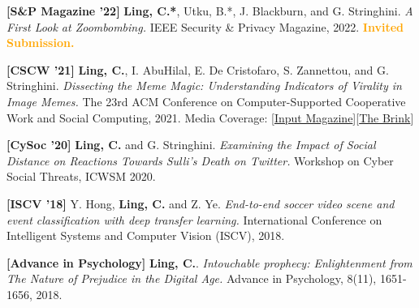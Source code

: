 \documentclass[12pt]{resume}
\begin{document}
\begin{etaremune}[leftmargin=.6in]
  \item \textbf{[S\&P Magazine '22]} 
    \textbf{Ling, C.*}, Utku, B.*, J. Blackburn, and G. Stringhini.
    \newline \textit{A First Look at Zoombombing.}
    \newline IEEE Security \& Privacy Magazine, 2022. \textbf{\textcolor{orange}{Invited Submission.}}

    
    \item \textbf{[CSCW '21]}
   \textbf{Ling, C.}, I. AbuHilal, E. De Cristofaro, S. Zannettou, and G. Stringhini.
   \newline \textit{Dissecting the Meme Magic: Understanding Indicators of Virality in Image Memes.} 
   \newline The 23rd ACM Conference on Computer-Supported Cooperative Work and Social Computing, 2021. 
   \newline Media Coverage: [\href{https://www.inverse.com/input/culture/viral-meme-ai-study-bernie-sanders}{Input Magazine}][\href{https://www.bu.edu/articles/2021/bernie-sanders-sitting-memes-instant-popularity-explained-by-science/?utm_source=twitter&utm_medium=link&utm_content=research_computerscience&utm_campaign=social_experts}{The Brink}] 
    
    \item \textbf{[CySoc '20]}
    \textbf{Ling, C.} and G. Stringhini. 
    \newline \textit{Examining the Impact of Social Distance on Reactions Towards Sulli’s Death on Twitter.}
    \newline Workshop on Cyber Social Threats, ICWSM 2020. 
    
    \item \textbf{[ISCV '18]}
    Y. Hong, \textbf{Ling, C.} and Z. Ye. 
    \newline \textit{End-to-end soccer video scene and event classification with deep transfer learning.} 
    \newline International Conference on Intelligent Systems and Computer Vision (ISCV), 2018. 
    \newline [\href{https://ieeexplore.ieee.org/stamp/stamp.jsp?tp=&arnumber=8369043}{Paper}]

    \item \textbf{[Advance in Psychology]}
    \textbf{Ling, C.}. 
    \newline \textit{Intouchable prophecy: Enlightenment from The Nature of Prejudice in the Digital Age.} 
    \newline Advance in Psychology, 8(11), 1651-1656, 2018. 
\end{etaremune}
\end{document}
